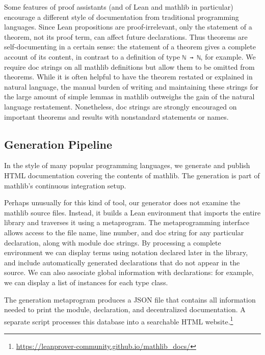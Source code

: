 \documentclass[runningheads]{llncs}
\newcommand{\mathlib}{\textsf{mathlib}\xspace}
\begin{document}
Some features of proof assistants
(and of Lean and \mathlib in particular)
encourage a different style of documentation
from traditional programming languages.
Since Lean propositions are proof-irrelevant,
only the statement of a theorem,
not its proof term,
can affect future declarations.
Thus theorems are self-documenting in a certain sense:
the statement of a theorem gives a complete account of its content,
in contrast to a definition of type \lstinline{ℕ → ℕ}, for example.
We require doc strings on all \mathlib definitions
but allow them to be omitted from theorems.
While it is often helpful
to have the theorem restated or explained in natural language,
the manual burden of writing and maintaining these strings
for the large amount of simple lemmas in \mathlib
outweighs the gain of the natural language restatement.
Nonetheless, doc strings are strongly encouraged on important theorems
and results with nonstandard statements or names.

\subsection{Generation Pipeline}

In the style of many popular programming languages,
we generate and publish HTML documentation
covering the contents of \mathlib.
The generation is part of \mathlib's continuous integration setup.

Perhaps unusually for this kind of tool,
our generator does not examine the \mathlib source files.
Instead, it builds a Lean environment that imports the entire library
and traverses it using a metaprogram.
The metaprogramming interface allows access to the file name, line number, and doc string
for any particular declaration,
along with module doc strings.
By processing a complete environment
we can display terms using notation declared later in the library,
and include automatically generated declarations
that do not appear in the source.
We can also associate global information with declarations:
for example, we can display a list of instances for each type class.

The generation metaprogram produces a JSON file
that contains all information needed
to print the module, declaration, and decentralized documentation.
A separate script processes this database
into a searchable HTML website.\footnote{\url{https://leanprover-community.github.io/mathlib_docs/}}
\end{document}
